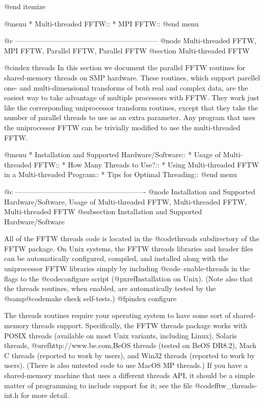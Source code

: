 @end itemize

@menu
* Multi-threaded FFTW::         
* MPI FFTW::                    
@end menu

@c ------------------------------------------------------------
@node Multi-threaded FFTW, MPI FFTW, Parallel FFTW, Parallel FFTW
@section Multi-threaded FFTW

@cindex threads
In this section we document the parallel FFTW routines for shared-memory
threads on SMP hardware.  These routines, which support parellel one-
and multi-dimensional transforms of both real and complex data, are the
easiest way to take advantage of multiple processors with FFTW.  They
work just like the corresponding uniprocessor transform routines, except
that they take the number of parallel threads to use as an extra
parameter.  Any program that uses the uniprocessor FFTW can be trivially
modified to use the multi-threaded FFTW.

@menu
* Installation and Supported Hardware/Software::  
* Usage of Multi-threaded FFTW::  
* How Many Threads to Use?::    
* Using Multi-threaded FFTW in a Multi-threaded Program::  
* Tips for Optimal Threading::  
@end menu

@c -------------------------------------------------------
@node Installation and Supported Hardware/Software, Usage of Multi-threaded FFTW, Multi-threaded FFTW, Multi-threaded FFTW
@subsection Installation and Supported Hardware/Software

All of the FFTW threads code is located in the @code{threads}
subdirectory of the FFTW package.  On Unix systems, the FFTW threads
libraries and header files can be automatically configured, compiled,
and installed along with the uniprocessor FFTW libraries simply by
including @code{--enable-threads} in the flags to the @code{configure}
script (@pxref{Installation on Unix}).  (Note also that the threads
routines, when enabled, are automatically tested by the @samp{@code{make
check}} self-tests.)
@fpindex configure

The threads routines require your operating system to have some sort of
shared-memory threads support.  Specifically, the FFTW threads package
works with POSIX threads (available on most Unix variants, including
Linux), Solaris threads, @uref{http://www.be.com,BeOS} threads (tested
on BeOS DR8.2), Mach C threads (reported to work by users), and Win32
threads (reported to work by users).  (There is also untested code to
use MacOS MP threads.)  If you have a shared-memory machine that uses a
different threads API, it should be a simple matter of programming to
include support for it; see the file @code{fftw_threads-int.h} for more
detail.

